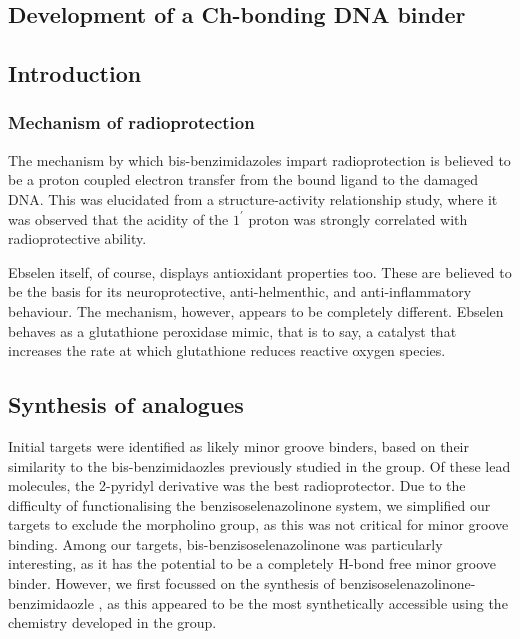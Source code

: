 \begin{refsection}

\chapter{Development of a Ch-bonding DNA binder}
\section{Introduction}

\subsection{Mechanism of radioprotection}
The mechanism by which bis-benzimidazoles impart radioprotection is believed to be a proton coupled electron transfer from the bound ligand to the damaged DNA.\autocite{???}
This was elucidated from a structure-activity relationship study, where it was observed that the acidity of the $1^\prime$ proton was strongly correlated with radioprotective ability.

Ebselen itself, of course, displays antioxidant properties too.
These are believed to be the basis for its neuroprotective, anti-helmenthic, and anti-inflammatory behaviour.\autocite{???}
The mechanism, however, appears to be completely different.
Ebselen behaves as a glutathione peroxidase mimic, that is to say, a catalyst that increases the rate at which glutathione reduces reactive oxygen species.

\section{Synthesis of analogues}
Initial targets  were identified as likely minor groove binders, based on their similarity to the bis-benzimidaozles previously studied in the group.
Of these lead molecules, the 2-pyridyl derivative  was the best radioprotector.
Due to the difficulty of functionalising the benzisoselenazolinone system, we simplified our targets to exclude the morpholino group, as this was not critical for minor groove binding.
Among our targets, bis-benzisoselenazolinone  was particularly interesting, as it has the potential to be a completely H-bond free minor groove binder.
However, we first focussed on the synthesis of benzisoselenazolinone-benzimidaozle , as this appeared to be the most synthetically accessible using the chemistry developed in the group.


\end{refsection}
